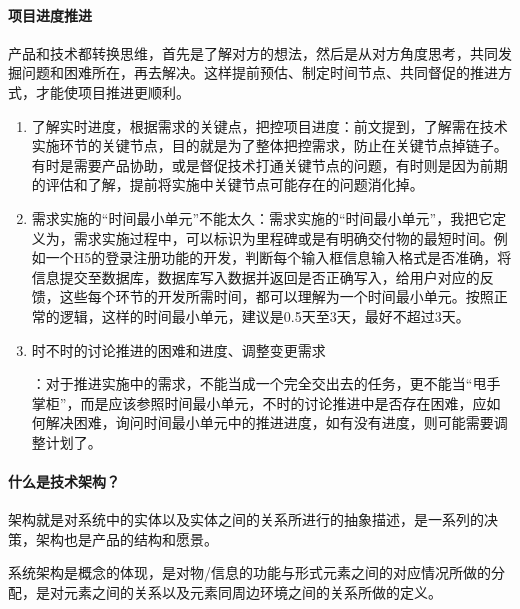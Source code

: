 \documentclass[letterpaper,11pt,english]{sphinxmanual}
\begin{document}
\paragraph{项目进度推进}
\label{\detokenize{chapter_idea/understand_tech:id12}}
产品和技术都转换思维，首先是了解对方的想法，然后是从对方角度思考，共同发掘问题和困难所在，再去解决。这样提前预估、制定时间节点、共同督促的推进方式，才能使项目推进更顺利。
\begin{enumerate}
%
\item {} 
了解实时进度，根据需求的关键点，把控项目进度：前文提到，了解需在技术实施环节的关键节点，目的就是为了整体把控需求，防止在关键节点掉链子。有时是需要产品协助，或是督促技术打通关键节点的问题，有时则是因为前期的评估和了解，提前将实施中关键节点可能存在的问题消化掉。

\item {} 
需求实施的“时间最小单元”不能太久：需求实施的“时间最小单元”，我把它定义为，需求实施过程中，可以标识为里程碑或是有明确交付物的最短时间。例如一个H5的登录注册功能的开发，判断每个输入框信息输入格式是否准确，将信息提交至数据库，数据库写入数据并返回是否正确写入，给用户对应的反馈，这些每个环节的开发所需时间，都可以理解为一个时间最小单元。按照正常的逻辑，这样的时间最小单元，建议是0.5天至3天，最好不超过3天。

\item {} 
时不时的讨论推进的困难和进度、调整变更需求%
\begin{footnote}[371]\sphinxAtStartFootnote
{}
%
\end{footnote}：对于推进实施中的需求，不能当成一个完全交出去的任务，更不能当“甩手掌柜”，而是应该参照时间最小单元，不时的讨论推进中是否存在困难，应如何解决困难，询问时间最小单元中的推进进度，如有没有进度，则可能需要调整计划了。

\end{enumerate}


\paragraph{什么是技术架构？}
\label{\detokenize{chapter_idea/understand_tech:id13}}
架构就是对系统中的实体以及实体之间的关系所进行的抽象描述，是一系列的决策，架构也是产品的结构和愿景。

系统架构是概念的体现，是对物/信息的功能与形式元素之间的对应情况所做的分配，是对元素之间的关系以及元素同周边环境之间的关系所做的定义。
\end{document}
